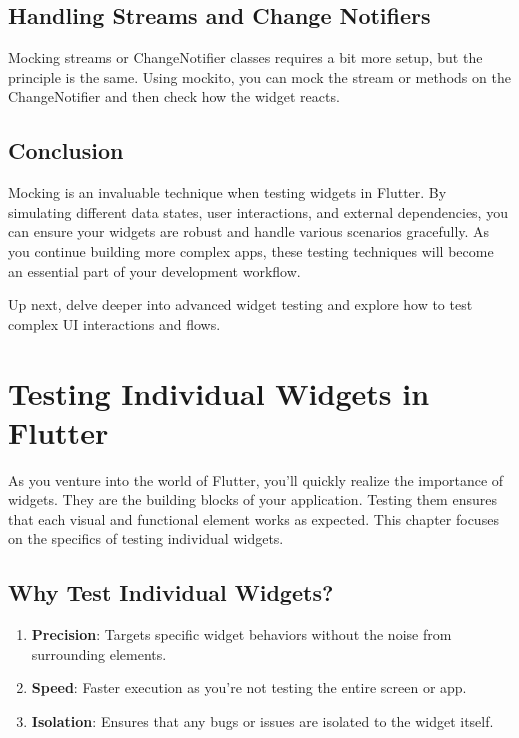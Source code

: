 \documentclass[
]{article}
\providecommand{\tightlist}{%
  \setlength{\itemsep}{0pt}\setlength{\parskip}{0pt}}
\begin{document}
\subsection{Handling Streams and Change
Notifiers}\label{handling-streams-and-change-notifiers}

Mocking streams or ChangeNotifier classes requires a bit more setup, but
the principle is the same. Using mockito, you can mock the stream or
methods on the ChangeNotifier and then check how the widget reacts.

\subsection{Conclusion}\label{conclusion-5}

Mocking is an invaluable technique when testing widgets in Flutter. By
simulating different data states, user interactions, and external
dependencies, you can ensure your widgets are robust and handle various
scenarios gracefully. As you continue building more complex apps, these
testing techniques will become an essential part of your development
workflow.

Up next, delve deeper into advanced widget testing and explore how to
test complex UI interactions and flows.

\section{Testing Individual Widgets in
Flutter}\label{testing-individual-widgets-in-flutter}

As you venture into the world of Flutter, you'll quickly realize the
importance of widgets. They are the building blocks of your application.
Testing them ensures that each visual and functional element works as
expected. This chapter focuses on the specifics of testing individual
widgets.

\subsection{Why Test Individual
Widgets?}\label{why-test-individual-widgets}

\begin{enumerate}
\def\labelenumi{\arabic{enumi}.}
\tightlist
\item
  \textbf{Precision}: Targets specific widget behaviors without the
  noise from surrounding elements.
\item
  \textbf{Speed}: Faster execution as you're not testing the entire
  screen or app.
\item
  \textbf{Isolation}: Ensures that any bugs or issues are isolated to
  the widget itself.
\end{enumerate}
\end{document}
